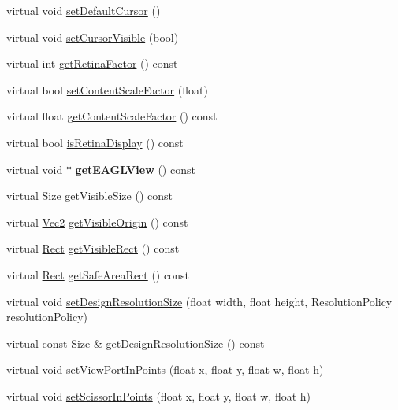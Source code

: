 \begin{DoxyCompactItemize}
\item 
virtual void \hyperlink{classGLView_a527977ed54ff5ae4ca8a3e2e7a541551}{set\+Default\+Cursor} ()
\item 
virtual void \hyperlink{classGLView_afa971ce0119e72731a7ff42443d3e90d}{set\+Cursor\+Visible} (bool)
\item 
virtual int \hyperlink{classGLView_a5dd430351b6192d7c014458e7863ba6d}{get\+Retina\+Factor} () const
\item 
virtual bool \hyperlink{classGLView_aed19813eb650f6d30f0f385a8f5c4a62}{set\+Content\+Scale\+Factor} (float)
\item 
virtual float \hyperlink{classGLView_a730b2ced5ee33d2bf975eb3fffd317bf}{get\+Content\+Scale\+Factor} () const
\item 
virtual bool \hyperlink{classGLView_a6b51811c80d053326246f2f318010edc}{is\+Retina\+Display} () const
\item 
\mbox{\label{classGLView_a5b0d14981b3b688a747a194c87bbe9a0}} 
virtual void $\ast$ {\bfseries get\+E\+A\+G\+L\+View} () const
\item 
virtual \hyperlink{classSize}{Size} \hyperlink{classGLView_aae96f8054234a3e35478a6f5518c03b0}{get\+Visible\+Size} () const
\item 
virtual \hyperlink{classVec2}{Vec2} \hyperlink{classGLView_acb5d330576705d12b2468282f8def3b2}{get\+Visible\+Origin} () const
\item 
virtual \hyperlink{classRect}{Rect} \hyperlink{classGLView_a48ef3d920aea2744c7f48db26b1da1c4}{get\+Visible\+Rect} () const
\item 
virtual \hyperlink{classRect}{Rect} \hyperlink{classGLView_a2faaa7d06e887d6e8c832868f23e0adc}{get\+Safe\+Area\+Rect} () const
\item 
virtual void \hyperlink{classGLView_af0c6db7063ef5d16cec6e9305313f576}{set\+Design\+Resolution\+Size} (float width, float height, Resolution\+Policy resolution\+Policy)
\item 
virtual const \hyperlink{classSize}{Size} \& \hyperlink{classGLView_adcaede3f487202ed5fef44550274396a}{get\+Design\+Resolution\+Size} () const
\item 
virtual void \hyperlink{classGLView_a189fdd0ef4a85b26170305676216e763}{set\+View\+Port\+In\+Points} (float x, float y, float w, float h)
\item 
virtual void \hyperlink{classGLView_ac53be51610430ad8a8422c391886b9bd}{set\+Scissor\+In\+Points} (float x, float y, float w, float h)
\item 

\end{DoxyCompactItemize}
